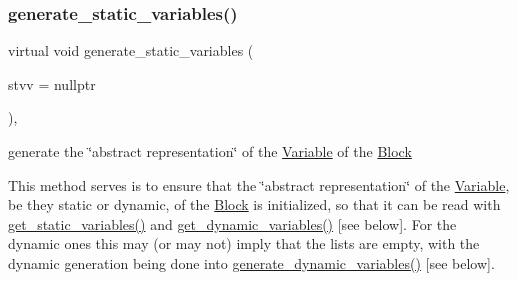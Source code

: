\subsubsection{\texorpdfstring{generate\+\_\+static\+\_\+variables()}{generate\_static\_variables()}}
{\footnotesize\ttfamily virtual void generate\+\_\+static\+\_\+variables (\begin{DoxyParamCaption}\item[{\mbox{\hyperlink{class_s_m_spp__di__unipi__it_1_1_configuration}{Configuration}} $\ast$}]{stvv = {\ttfamily nullptr} }\end{DoxyParamCaption})\hspace{0.3cm}{\ttfamily [inline]}, {\ttfamily [virtual]}}



generate the \char`\"{}abstract representation\char`\"{} of the \mbox{\hyperlink{class_s_m_spp__di__unipi__it_1_1_variable}{Variable}} of the \mbox{\hyperlink{class_s_m_spp__di__unipi__it_1_1_block}{Block}} 

This method serves is to ensure that the \char`\"{}abstract representation\char`\"{} of the \mbox{\hyperlink{class_s_m_spp__di__unipi__it_1_1_variable}{Variable}}, be they static or dynamic, of the \mbox{\hyperlink{class_s_m_spp__di__unipi__it_1_1_block}{Block}} is initialized, so that it can be read with \mbox{\hyperlink{class_s_m_spp__di__unipi__it_1_1_block_a6ca8b345bb506a8ac45eef39887bebea}{get\+\_\+static\+\_\+variables()}} and \mbox{\hyperlink{class_s_m_spp__di__unipi__it_1_1_block_a9c17adfb0c344b44e163d40f7fc6926f}{get\+\_\+dynamic\+\_\+variables()}} \mbox{[}see below\mbox{]}. For the dynamic ones this may (or may not) imply that the lists are empty, with the dynamic generation being done into \mbox{\hyperlink{class_s_m_spp__di__unipi__it_1_1_block_ab90d0f60518eee75370e29c95bae4522}{generate\+\_\+dynamic\+\_\+variables()}} \mbox{[}see below\mbox{]}.

